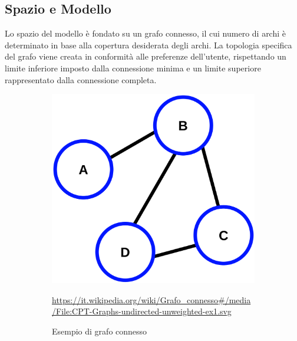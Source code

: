 \subsection{Spazio e Modello}
Lo spazio del modello è fondato su un grafo connesso, il cui numero 
di archi è determinato in base alla copertura desiderata degli archi. 
La topologia specifica del grafo viene creata in conformità alle 
preferenze dell'utente, rispettando un limite inferiore imposto dalla 
connessione minima e un limite superiore rappresentato dalla connessione 
completa.

\begin{figure}[H]
	\centering
	\begin{subfigure}[b]{0.45\textwidth}
		\centering
		\includegraphics[width=\textwidth]{img/CPT-Graphs-undirected-unweighted-ex1.svg.png}
		\caption{Esempio di grafo connesso}
		\url{https://it.wikipedia.org/wiki/Grafo_connesso#/media/File:CPT-Graphs-undirected-unweighted-ex1.svg}
		\label{fig:connected_graph_example}
	\end{subfigure}
	\hfill
	\begin{subfigure}[b]{0.45\textwidth}
		\centering

\end{subfigure}
\end{figure}
